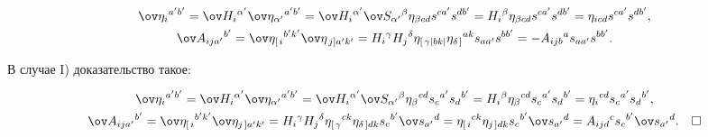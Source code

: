 \begin{gather*}


\ov \eta_i{}^{a'b'}=\ov H_i{}^{\alpha '}


\ov \eta_{\alpha '}{}^{a'b'}=


\ov H_i{}^{\alpha '}\ov S_{\alpha '}{}^\beta


\eta_{\beta cd} s^{ca'}s^{db'}=


H_i{}^\beta \eta_{\beta cd} s^{ca'}s^{db'}=


\eta_{i cd} s^{ca'}s^{db'},\\


%


\ov A_{ij a'}{}^{b'}=\ov \eta_{\left[\right. i}{}^{b'k'}


\ov \eta_{\left. j\right] a'k'}=


H_i{}^{\gamma}H_j{}^\delta \eta_{\left[\right. \gamma | bk |}


\eta_{\delta\left.\right]}{}^{ak} s_{aa'}s^{bb'}=


-A_{ij b}{}^a s_{aa'}s^{bb'}.


\end{gather*}


В случае I) доказательство такое:


\begin{gather*}


\ov \eta_i{}^{a'b'}=\ov H_i{}^{\alpha '}


\ov \eta_{\alpha '}{}^{a'b'}=


\ov H_i{}^{\alpha '}\ov S_{\alpha '}{}^\beta


\eta_\beta{}^{cd} s_c{}^{a'}s_d{}^{b'}=


H_i{}^\beta \eta_\beta{}^{cd} s_c{}^{a'}s_d{}^{b'}=


\eta_i{}^{cd} s_c{}^{a'}s_d{}^{b'},\\


%


\ov A_{ij a'}{}^{b'}=\ov \eta_{\left[\right. i}{}^{b'k'}


\ov \eta_{j\left.\right] a'k'}=


H_i{}^{\gamma}H_j{}^\delta \eta_{\left[\right. \gamma}{}^{ck}


\eta_{\delta\left.\right] dk} s_c{}^{b'}\ov s_{a'}{}^d=


\eta_{\left[\right. i}{}^{ck} \eta_{j\left.\right] dk}


s_c{}^{b'}\ov s_{a'}{}^d=


A_{ij d}{}^c s_c{}^{b'}\ov s_{a'}{}^d.\quad\square


\end{gather*}





